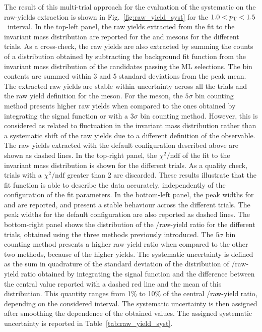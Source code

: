 The result of this multi-trial approach for the evaluation of the systematic on the raw-yields extraction is shown in Fig.~\ref{fig:raw_yield_syst} for the $1.0<p_\mathrm{T}<1.5$~\gevc interval. In the top-left panel, the raw yields extracted from the fit to the invariant mass distribution are reported for the \ds and \dpl mesons for the different trials. As a cross-check, the raw yields are also extracted by summing the counts of a distribution obtained by subtracting the background fit function from the invariant mass distribution of the candidates passing the ML selections. The bin contents are summed within 3 and 5 standard deviations from the peak mean. The extracted raw yields are stable within uncertainty across all the trials and the raw yield definition for the \dpl meson. For the \ds meson, the $5\sigma$ bin counting method presents higher raw yields when compared to the ones obtained by integrating the signal function or with a $3\sigma$ bin counting method. However, this is considered as related to fluctuation in the invariant mass distribution rather than a systematic shift of the raw yields due to a different definition of the observable. The raw yields extracted with the default configuration described above are shown as dashed lines. In the top-right panel, the $\chi^2/\mathrm{ndf}$ of the fit to the invariant mass distribution is shown for the different trials. As a quality check, trials with a $\chi^2/\mathrm{ndf}$ greater than 2 are discarded. These results illustrate that the fit function is able to describe the data accurately, independently of the configuration of the fit parameters. In the bottom-left panel, the peak widths for \ds and \dpl are reported, and present a stable behaviour across the different trials. The peak widths for the default configuration are also reported as dashed lines. The bottom-right panel shows the distribution of the \ds/\dpl raw-yield ratio for the different trials, obtained using the three methods previously introduced. The $5\sigma$ bin counting method presents a higher raw-yield ratio when compared to the other two methods, because of the higher \ds yields. The systematic uncertainty is defined as the sum in quadrature of the standard deviation of the distribution of \ds/\dpl raw-yield ratio obtained by integrating the signal function and the difference between the central value reported with a dashed red line and the mean of this distribution. This quantity ranges from 1\% to 10\% of the central \ds/\dpl raw-yield ratio, depending on the considered \pt interval. The systematic uncertainty is then assigned after smoothing the \pt dependence of the obtained values. The assigned systematic uncertainty is reported in Table~\ref{tab:raw_yield_syst}.




